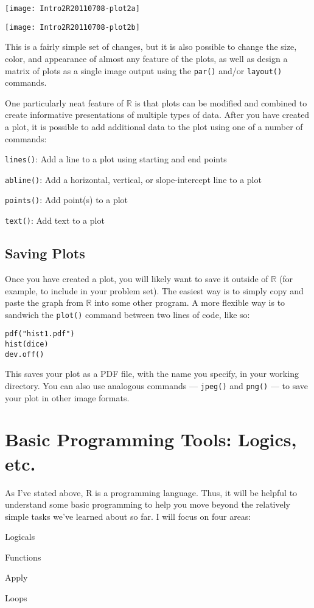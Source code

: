 \documentclass[12pt]{article}
\begin{document}
\begin{minipage}[b]{0.5\linewidth}
\texttt{[image: Intro2R20110708-plot2a]}
\end{minipage}
\begin{minipage}[b]{0.5\linewidth}
\texttt{[image: Intro2R20110708-plot2b]}
\end{minipage}

This is a fairly simple set of changes, but it is also possible to change the size, color, and appearance of almost any feature of the plots, as well as design a matrix of plots as a single image output using the \verb|par()| and/or \verb|layout()| commands.

One particularly neat feature of $\mathbb{R}$ is that plots can be modified and combined to create informative presentations of multiple types of data. After you have created a plot, it is possible to add additional data to the plot using one of a number of commands:
\begin{itemize*}
\item \verb|lines()|: Add a line to a plot using starting and end points
\item \verb|abline()|: Add a horizontal, vertical, or slope-intercept line to a plot
\item \verb|points()|: Add point(s) to a plot
\item \verb|text()|: Add text to a plot
\end{itemize*}

\subsection{Saving Plots}
Once you have created a plot, you will likely want to save it outside of $\mathbb{R}$ (for example, to include in your problem set). The easiest way is to simply copy and paste the graph from $\mathbb{R}$ into some other program. A more flexible way is to sandwich the \verb|plot()| command between two lines of code, like so:
\begin{verbatim}
pdf("hist1.pdf")
hist(dice)
dev.off()
\end{verbatim}
This saves your plot as a PDF file, with the name you specify, in your working directory. You can also use analogous commands --- \verb|jpeg()| and \verb|png()| --- to save your plot in other image formats.

\section{Basic Programming Tools: Logics, etc.}\label{sec:programming}
As I've stated above, R is a programming language. Thus, it will be helpful to understand some basic programming to help you move beyond the relatively simple tasks we've learned about so far. I will focus on four areas:
\begin{enumerate*}
\item Logicals
\item Functions
\item Apply
\item Loops
\end{enumerate*}
\end{document}
